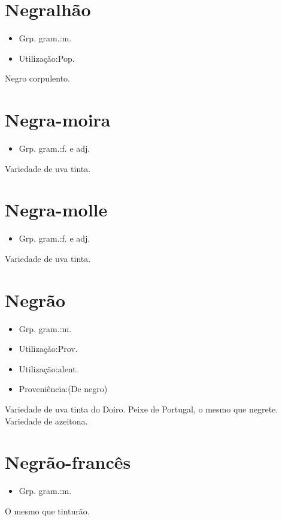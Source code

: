 \section{Negralhão}
\begin{itemize}
\item {Grp. gram.:m.}
\end{itemize}
\begin{itemize}
\item {Utilização:Pop.}
\end{itemize}
Negro corpulento.
\section{Negra-moira}
\begin{itemize}
\item {Grp. gram.:f.  e  adj.}
\end{itemize}
Variedade de uva tinta.
\section{Negra-molle}
\begin{itemize}
\item {Grp. gram.:f.  e  adj.}
\end{itemize}
Variedade de uva tinta.
\section{Negrão}
\begin{itemize}
\item {Grp. gram.:m.}
\end{itemize}
\begin{itemize}
\item {Utilização:Prov.}
\end{itemize}
\begin{itemize}
\item {Utilização:alent.}
\end{itemize}
\begin{itemize}
\item {Proveniência:(De \textunderscore negro\textunderscore )}
\end{itemize}
Variedade de uva tinta do Doiro.
Peixe de Portugal, o mesmo que \textunderscore negrete\textunderscore .
Variedade de azeitona.
\section{Negrão-francês}
\begin{itemize}
\item {Grp. gram.:m.}
\end{itemize}
O mesmo que \textunderscore tinturão\textunderscore .
